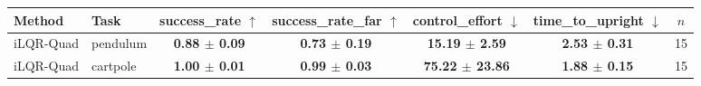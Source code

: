 \begin{tabular}{llccccc}
\toprule
Method & Task & success\_rate $\uparrow$ & success\_rate\_far $\uparrow$ & control\_effort $\downarrow$ & time\_to\_upright $\downarrow$ & $n$ \\
\midrule
iLQR-Quad & pendulum & \textbf{0.88 $\pm$ 0.09} & \textbf{0.73 $\pm$ 0.19} & \textbf{15.19 $\pm$ 2.59} & \textbf{2.53 $\pm$ 0.31} & 15 \\
\midrule
iLQR-Quad & cartpole & \textbf{1.00 $\pm$ 0.01} & \textbf{0.99 $\pm$ 0.03} & \textbf{75.22 $\pm$ 23.86} & \textbf{1.88 $\pm$ 0.15} & 15 \\
\bottomrule
\end{tabular}
